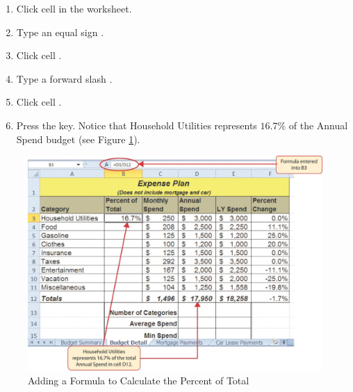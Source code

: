 \begin{enumerate}
	\item Click cell  in the  worksheet.
	\item Type an equal sign \fmtTyping{=}.
	\item Click cell .
	\item Type a forward slash \fmtTyping{/}.
	\item Click cell .
	\item Press the  key. Notice that Household Utilities represents $ 16.7$\% of the Annual Spend budget (see Figure \ref{02:fig14}).
\end{enumerate}

\begin{figure}[H]
	\centering
	\includegraphics[width=\maxwidth{.95\linewidth}]{gfx/ch02_fig14}
	\caption{Adding a Formula to Calculate the Percent of Total}
	\label{02:fig14}
\end{figure}

